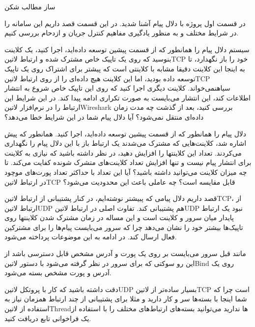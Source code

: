 \documentclass[]{article}
\begin{document}
  ‌ساز
  ‌مطالب
  ‌شکن


  در قسمت اول پروژه با دلال پیام آشنا شدید. در این قسمت قصد داریم این سامانه را در شرایط مختلف
  و به منظور یادگیری مفاهیم کنترل جریان و ازدحام بررسی کنیم.


  سیستم دلال پیام را همانطور که از قسمت پیشین توسعه داده‌اید، اجرا کنید، یک کلاینت بنوسید که روی یک تاپیک خاص مشترک شده
  و ارتباط ‌لاتین{TCP} خود را باز نگهدارد، تا به اینجا این کلاینت دقیقا مشابه با کلاینتی است که پیشتر برای اشتراک روی یک تاپیک توسعه داده بودید،
  اما این کلاینت هیچ داده‌ای را از روی ارتباط ‌لاتین{TCP} ‌سیاه{نمی‌خواند}.
  کلاینت دیگری اجرا کنید که روی این تاپیک خاص شروع به انتشار اطلاعات کند، این انتشار می‌بایست به صورت تکراری ادامه پیدا کند.
  در این شرایط این ارتباط را در نرم‌افزار ‌لاتین{Wireshark} بررسی کنید، بعد از گذشت چه مدت زمان داده‌ای منتقل نمی‌شود؟
  آیا دلال پیام شما در این شرایط خطا می‌دهد؟


  دلال پیام را همانطور که از قسمت پیشین توسعه داده‌اید، اجرا کنید. همانطور که پیش اشاره شد، کلاینت‌هایی که مشترک می‌شدند
  یک ارتباط باز با این دلال پیام را نگهداری می‌کردند. تعداد این کلاینتها را افزایش دهید، در نظر داشته باشید که نیازی به کلاینت برای انتشار
  پیام نیست و تنها افزایش تعداد کلاینت‌های متشرک شونده کفایت می‌کند.
  تا چه میزان کلاینت می‌توانید داشته باشید؟ آیا این تعداد با حداکثر تعداد
  پورت‌های موچود در ارتباط ‌لاتین{TCP} قابل مقایسه است؟ چه عاملی باعث این محدودیت می‌شود؟


  قصد داریم دلال پیامی که پبیشتر نوشته‌ایم، در کنار پشتیبانی از ارتباط ‌لاتین{TCP}، از ارتباط ‌لاتین{UDP} هم پشتیبانی کند.
  تفاوت اصلی در ارتباط ‌لاتین{UDP} نبود یک ارتباط پایدار میان سرور و کلاینت است و این مساله در زمان مشترک شدن
  کلاینتها روی تاپیک‌ها بیشتر خود را نشان می‌دهد چرا که سرور می‌بایست پیام‌ها را برای مشترکین فعال ارسال کند.
  در ادامه به این موضوعات پرداخته می‌شود.



  مانند قبل سرور می‌بایست بر روی یک پورت و آدرس مشخص قابل دسترسی باشد از این رو سوکتی که برای سرور در نظر گرفته می‌شود
  با دستور ‌لاتین{Bind} روی یک آدرس و پورت مشخص بسته می‌شود.

  دقت داشته باشید که کار با پروتکل ‌لاتین{UDP} بسیار ساده‌تر از ‌لاتین{TCP} است چرا که شما اینجا با بسته‌ها سر و کار دارید
  و مثلا برای پشتیبانی از چند ارتباط همزمان نیاز به استفاده از ‌لاتین{Thread}ها ندارید می‌توانید بسته‌های ارتباط‌های مختلف را
  با استفاده از یک فراخوانی تابع دریافت کنید.
\end{document}
